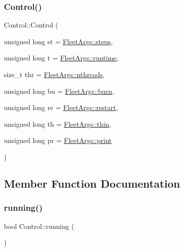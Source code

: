 \subsubsection{\texorpdfstring{Control()}{Control()}}
{\footnotesize\ttfamily Control\+::\+Control (\begin{DoxyParamCaption}\item[{unsigned long}]{st = {\ttfamily \hyperlink{namespace_fleet_args_a0cabfaa21ab6740518265b14df5948c7}{Fleet\+Args\+::steps}},  }\item[{unsigned long}]{t = {\ttfamily \hyperlink{namespace_fleet_args_a094bc8aa2836c57906405cde03d24fc6}{Fleet\+Args\+::runtime}},  }\item[{size\+\_\+t}]{thr = {\ttfamily \hyperlink{namespace_fleet_args_a90ee834a1804002baec2366daeda54a5}{Fleet\+Args\+::nthreads}},  }\item[{unsigned long}]{bu = {\ttfamily \hyperlink{namespace_fleet_args_a7dc1ce66659f9dc509b370d5660582e8}{Fleet\+Args\+::burn}},  }\item[{unsigned long}]{re = {\ttfamily \hyperlink{namespace_fleet_args_af0c62e1528330a5fb0ba9f01082aa823}{Fleet\+Args\+::restart}},  }\item[{unsigned long}]{th = {\ttfamily \hyperlink{namespace_fleet_args_add2603eb3b9b47d79684e1a12bcca2aa}{Fleet\+Args\+::thin}},  }\item[{unsigned long}]{pr = {\ttfamily \hyperlink{namespace_fleet_args_acf2f80bb2810cea3b3eeef0c4b0edf03}{Fleet\+Args\+::print}} }\end{DoxyParamCaption})\hspace{0.3cm}{\ttfamily [inline]}}



\subsection{Member Function Documentation}
\mbox{\label{struct_control_a9217475a8ad619e7360524ae49c559a7}} 
\subsubsection{\texorpdfstring{running()}{running()}}
{\footnotesize\ttfamily bool Control\+::running (\begin{DoxyParamCaption}{ }\end{DoxyParamCaption})\hspace{0.3cm}{\ttfamily [inline]}}

